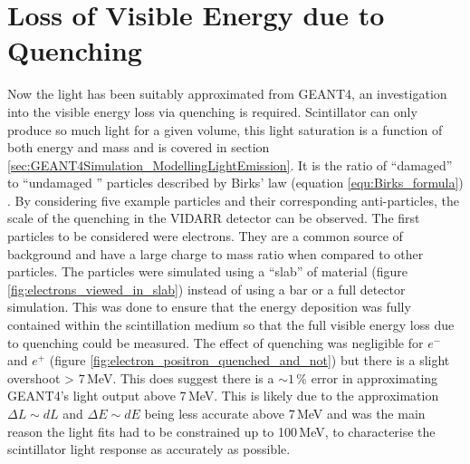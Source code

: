 \section{Loss of Visible Energy due to Quenching}\label{sec:GEANT4Simulation_quenchingLoss}
Now the light has been suitably approximated from GEANT4, an investigation into the visible energy loss via quenching is required. Scintillator can only produce so much light for a given volume, this light saturation is a function of both energy and mass and is covered in section \ref{sec:GEANT4Simulation_ModellingLightEmission}. It is the ratio of ``damaged'' to ``undamaged '' particles \cite{craun_1970} described by Birks' law (equation \ref{equ:Birks_formula}) \cite{knoll_2010}. By considering five example particles and their corresponding anti-particles, the scale of the quenching in the VIDARR detector can be observed. The first particles to be considered were electrons. They are a common source of background and have a large charge to mass ratio when compared to other particles. The particles were simulated using a ``slab'' of material (figure \ref{fig:electrons_viewed_in_slab}) instead of using a bar or a full detector simulation. This was done to ensure that the energy deposition was fully contained within the scintillation medium so that the full visible energy loss due to quenching could be measured. The effect of quenching was negligible for $e^-$ and $e^+$ (figure \ref{fig:electron_positron_quenched_and_not}) but there is a slight overshoot > 7\,MeV. This does suggest there is a $\sim 1\,\%$ error in approximating GEANT4's light output above 7\,MeV. This is likely due to the approximation $\Delta L \sim dL$ and $\Delta E \sim dE$  being less accurate above 7\,MeV and was the main reason the light fits had to be constrained up to 100\,MeV, to characterise the scintillator light response as accurately as possible. 

